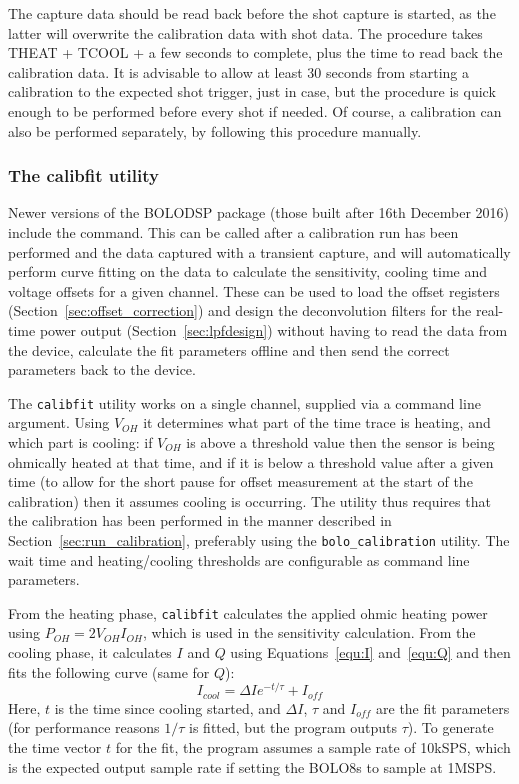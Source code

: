 \documentclass[12pt,a4paper]{article}
\begin{document}
The capture data should be read back before the shot capture is started, as the latter will overwrite the calibration data with shot data. The procedure
takes THEAT + TCOOL + a few seconds to complete, plus the time to read back the calibration data. It is advisable to allow at least 30 seconds from
starting a calibration to the expected shot trigger, just in case, but the procedure is quick enough to be performed before every shot if needed. Of
course, a calibration can also be performed separately, by following this procedure manually.

\subsubsection{The calibfit utility}
\label{sec:calibfit}
Newer versions of the BOLODSP package (those built after 16th December 2016) include the \mbox{} command. This can be
called after a calibration run has been performed and the data captured with a transient capture, and will automatically perform curve fitting on the
data to calculate the sensitivity, cooling time and voltage offsets for a given channel. These can be used to load the offset registers
(Section~\ref{sec:offset_correction}) and design the deconvolution filters for the real-time power output (Section~\ref{sec:lpfdesign}) without having
to read the data from the device, calculate the fit parameters offline and then send the correct parameters back to the device.

The \texttt{calibfit} utility works on a single channel, supplied via a command line argument. Using $V_{OH}$ it determines what part of the time trace
is heating, and which part is cooling: if $V_{OH}$ is above a threshold value then the sensor is being ohmically heated at that time, and if it is
below a threshold value after a given time (to allow for the short pause for offset measurement at the start of the calibration) then it assumes
cooling is occurring. The utility thus requires that the calibration has been performed in the manner described in Section~\ref{sec:run_calibration},
preferably using the \texttt{bolo\_calibration} utility. The wait time and heating/cooling thresholds are configurable as command line parameters.

From the heating phase, \texttt{calibfit} calculates the applied ohmic heating power using $P_{OH} = 2 V_{OH} I_{OH}$, which is used in the sensitivity
calculation. From the cooling phase, it calculates $I$ and $Q$ using Equations~\ref{equ:I} and~\ref{equ:Q} and then fits the following curve (same
for $Q$):
\begin{equation}
  \label{equ:Icool}
  I_{cool} = \Delta I e^{-t / \tau} + I_{off}
\end{equation}
Here, $t$ is the time since cooling started, and $\Delta I$, $\tau$ and $I_{off}$ are the fit parameters (for performance reasons $1/\tau$ is fitted,
but the program outputs $\tau$). To generate the time vector $t$ for the fit, the program assumes a sample rate of 10kSPS, which is the expected output
sample rate if setting the BOLO8s to sample at 1MSPS\@.
\end{document}
